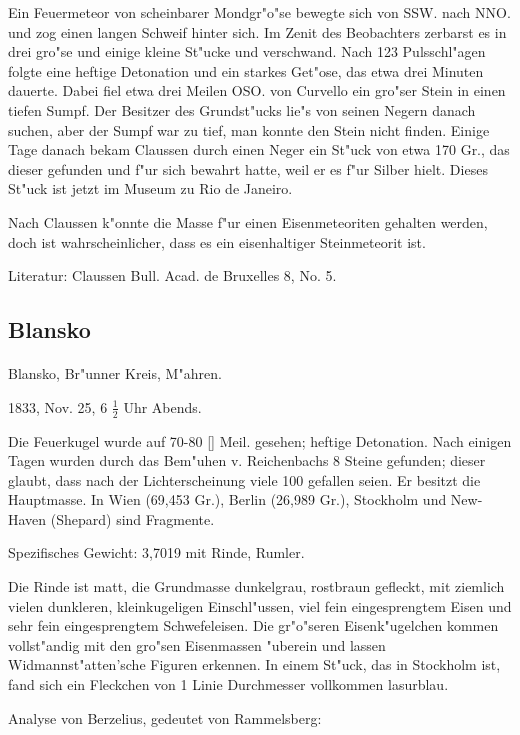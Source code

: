 \documentclass[a4paper, 11pt, oneside]{article}
\begin{document}
Ein Feuermeteor von scheinbarer Mondgr"o"se bewegte sich von SSW. nach NNO. und zog einen langen Schweif hinter sich. Im Zenit des Beobachters zerbarst es in drei gro"se und einige kleine St"ucke und verschwand. Nach 123 Pulsschl"agen folgte eine heftige Detonation und ein starkes Get"ose, das etwa drei Minuten dauerte. Dabei fiel etwa drei Meilen OSO. von Curvello ein gro"ser Stein in einen tiefen Sumpf. Der Besitzer des Grundst"ucks lie"s von seinen Negern danach suchen, aber der Sumpf war zu tief, man konnte den Stein nicht finden. Einige Tage danach bekam Claussen durch einen Neger ein St"uck von etwa 170 Gr., das dieser gefunden und f"ur sich bewahrt hatte, weil er es f"ur Silber hielt. Dieses St"uck ist jetzt im Museum zu Rio de Janeiro.

Nach Claussen k"onnte die Masse f"ur einen Eisenmeteoriten gehalten werden, doch ist wahrscheinlicher, dass es ein eisenhaltiger Steinmeteorit ist.

\footnotesize
Literatur: Claussen Bull. Acad. de Bruxelles 8, No. 5.

\subsection{Blansko}
\normalsize
\paragraph{}
Blansko, Br"unner Kreis, M"ahren.

1833, Nov. 25, 6 $\frac{1}{2}$ Uhr Abends.

Die Feuerkugel wurde auf 70-80 [] Meil. gesehen; heftige Detonation. Nach einigen Tagen wurden durch das Bem"uhen v. Reichenbachs 8 Steine gefunden; dieser glaubt, dass nach der Lichterscheinung viele 100 gefallen seien. Er besitzt die Hauptmasse. In Wien (69,453 Gr.), Berlin (26,989 Gr.), Stockholm und New-Haven (Shepard) sind Fragmente.

Spezifisches Gewicht: 3,7019 mit Rinde, Rumler.

Die Rinde ist matt, die Grundmasse dunkelgrau, rostbraun gefleckt, mit ziemlich vielen dunkleren, kleinkugeligen Einschl"ussen, viel fein eingesprengtem Eisen und sehr fein eingesprengtem Schwefeleisen. Die gr"o"seren Eisenk"ugelchen kommen vollst"andig mit den gro"sen Eisenmassen "uberein und lassen Widmannst"atten'sche Figuren erkennen. In einem St"uck, das in Stockholm ist, fand sich ein Fleckchen von 1 Linie Durchmesser vollkommen lasurblau.

Analyse von Berzelius, gedeutet von Rammelsberg:
\end{document}
